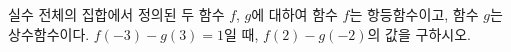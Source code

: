 실수 전체의 집합에서 정의된 두 함수 $f$, $g$에 대하여 함수 $f$는 항등함수이고, 함수 $g$는 상수함수이다. $f(-3)-g(3)=1$일 때, $f(2)-g(-2)$의 값을 구하시오.
